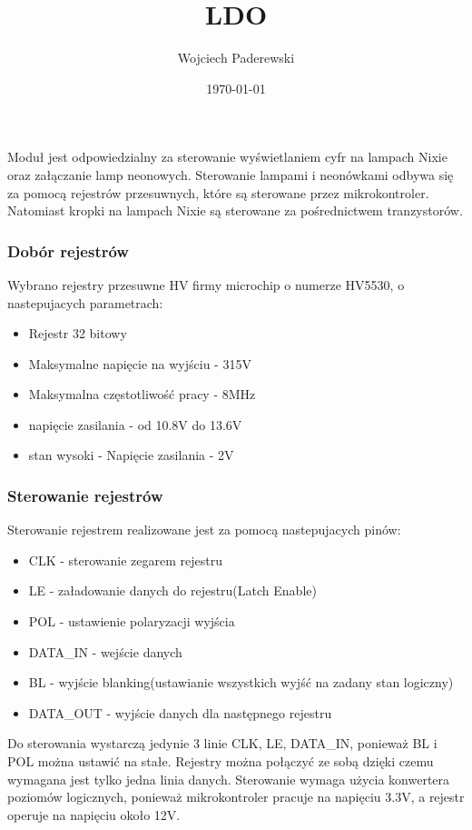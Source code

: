 \documentclass[../../main.tex]{subfiles}
\author{Wojciech Paderewski}
\date{\today}
\title{LDO}
\begin{document}
Moduł jest odpowiedzialny za sterowanie wyświetlaniem cyfr na lampach Nixie oraz załączanie lamp neonowych.
Sterowanie lampami i neonówkami odbywa się za pomocą rejestrów przesuwnych, które są sterowane przez mikrokontroler.
Natomiast kropki na lampach Nixie są sterowane za pośrednictwem tranzystorów.

\subsubsection{Dobór rejestrów}
Wybrano rejestry przesuwne HV firmy microchip o numerze HV5530, o nastepujacych parametrach\cite{st:rejestry}:
\begin{itemize}
    \item Rejestr 32 bitowy
    \item Maksymalne napięcie na wyjściu - 315V
    \item Maksymalna częstotliwość pracy - 8MHz
    \item napięcie zasilania - od 10.8\si{\volt} do 13.6\si{\volt}
    \item stan wysoki - Napięcie zasilania - 2V
\end{itemize}

\subsubsection{Sterowanie rejestrów}
Sterowanie rejestrem realizowane jest za pomocą nastepujacych pinów:
\begin{itemize}
    \item CLK - sterowanie zegarem rejestru
    \item LE - załadowanie danych do rejestru(Latch Enable)
    \item POL - ustawienie polaryzacji wyjścia
    \item DATA\_IN - wejście danych
    \item BL - wyjście blanking(ustawianie wszystkich wyjść na zadany stan logiczny)
    \item DATA\_OUT - wyjście danych dla następnego rejestru
\end{itemize}

Do sterowania wystarczą jedynie 3 linie CLK, LE, DATA\_IN, ponieważ BL i POL można ustawić na stałe.
Rejestry można połączyć ze sobą dzięki czemu wymagana jest tylko jedna linia danych.
Sterowanie wymaga użycia konwertera poziomów logicznych, ponieważ mikrokontroler pracuje na napięciu 3.3V, a rejestr operuje 
na napięciu około 12V.
\end{document}
